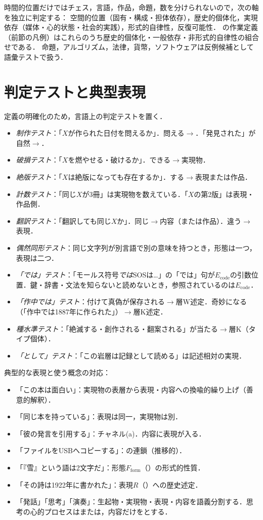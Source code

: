 \documentclass[../../main-detail.tex]{subfiles}
\begin{document}
時間的位置だけではチェス，言語，作品，命題，数を分けられないので，次の軸を独立に判定する：
空間的位置（固有・構成・担体依存），歴史的個体化，実現依存（媒体・心的状態・社会的実践），形式的自律性，反復可能性．
の作業定義（前節の凡例）はこれらのうち歴史的個体化・一般依存・非形式的自律性の組合せである．
命題，アルゴリズム，法律，貨幣，ソフトウェアは反例候補として語彙テストで扱う．

\section{判定テストと典型表現}
定義の明確化のため，言語上の判定テストを置く．
\begin{itemize}
    \item \emph{制作テスト}：「$X$が作られた日付を問えるか」．問える$\to$．「発見された」が自然$\to$．
    \item \emph{破損テスト}：「$X$を燃やせる・破けるか」．できる$\to$実現物．
    \item \emph{絶版テスト}：「$X$は絶版になっても存在するか」．する$\to$表現または作品．
    \item \emph{計数テスト}：「同じ$X$が3冊」は実現物を数えている．「$X$の第2版」は表現・作品側．
    \item \emph{翻訳テスト}：「翻訳しても同じ$X$か」．同じ$\to$内容（または作品）．違う$\to$表現．
    \item \emph{偶然同形テスト}：同じ文字列が別言語で別の意味を持つとき，形態は一つ，表現は二つ．
    \item \emph{「では」テスト}：「モールス符号\emph{では}SOSは…」の「では」句が$E_{\mathrm{code}}$の引数位置．鍵・辞書・文法を知らないと読めないとき，参照されているのは$E_{\mathrm{code}}$．
    \item \emph{「作中では」テスト}：付けて真偽が保存される$\to$層W述定．奇妙になる（「作中では1887年に作られた」）$\to$層K述定．
    \item \emph{種水準テスト}：「絶滅する・創作される・翻案される」が当たる$\to$層K（タイプ個体）．
    \item \emph{「として」テスト}：「この岩層は記録として読める」は記述相対の実現．
\end{itemize}
典型的な表現と使う概念の対応：
\begin{itemize}
    \item 「この本は面白い」：実現物の表層から表現・内容への換喩的繰り上げ（善意的解釈）．
    \item 「同じ本を持っている」：表現は同一，実現物は別．
    \item 「彼の発言を引用する」：チャネル(a)．内容に表現が入る．
    \item 「ファイルをUSBへコピーする」：の連鎖（推移的）．
    \item 「『雪』という語は2文字だ」：形態$F_{\mathrm{form}}$（）の形式的性質．
    \item 「その詩は1922年に書かれた」：表現$R$（）への歴史述定．
    \item 「発話」「思考」「演奏」：生起物・実現物・表現・内容を語義分割する．思考の心的プロセスはまたは，内容だけをとする．
\end{itemize}
\end{document}
